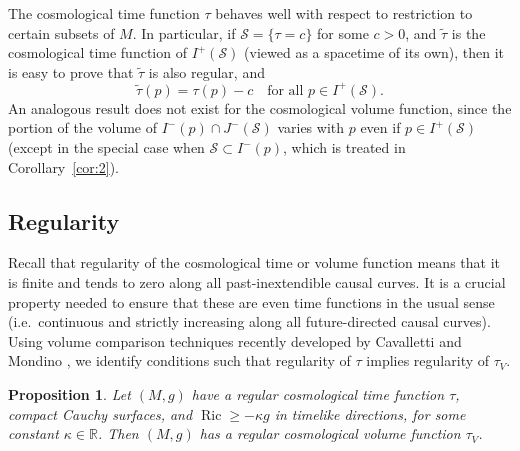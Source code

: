 \documentclass[a4paper,11pt]{amsart}
\newtheorem{proposition}[theorem]{{Proposition}}%
\newcommand{\R}{\mathbb{R}}
\newcommand{\CS}{\mathcal{S}}
\begin{document}
The cosmological time function $\tau$ behaves well with respect to restriction to certain subsets of $M$. In particular, if $\CS = \{\tau= c\}$ for some $c > 0$, and $\tilde\tau$ is the cosmological time function of $I^+(\CS)$ (viewed as a spacetime of its own), then it is easy to prove that $\tilde\tau$ is also regular, and
\begin{equation*}
    \tilde\tau(p) = \tau(p) - c \quad \text{for all } p \in I^+(\CS).
\end{equation*}
An analogous result does not exist for the cosmological volume function, since the portion of the volume of $I^-(p) \cap J^-(\CS)$ varies with $p$ even if $p \in I^+(\CS)$ (except in the special case when $\CS \subset I^-(p)$, which is treated in Corollary~\ref{cor:2}).

\subsection{Regularity}

Recall that regularity of the cosmological time or volume function means that it is finite and tends to zero along all past-inextendible causal curves. It is a crucial property needed to ensure that these are even time functions in the usual sense (i.e.\ continuous and strictly increasing along all future-directed causal curves). Using volume comparison techniques recently developed by Cavalletti and Mondino \cite{CaMo24}, we identify conditions such that regularity of $\tau$ implies regularity of $\tau_V$.

\begin{proposition}
 Let $(M,g)$ have a regular cosmological time function $\tau$, compact Cauchy surfaces, and $\operatorname{Ric} \geq -\kappa g$ in timelike directions, for some constant $\kappa \in \R$. Then $(M,g)$ has a regular cosmological volume function $\tau_V$.
\end{proposition}
\end{document}
